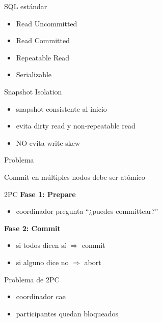 \documentclass[institutional,screen,none]{ua-engineering-v6-beamer}
\begin{document}

\begin{frame}{SQL estándar}
\begin{itemize}
\item Read Uncommitted
\item Read Committed
\item Repeatable Read
\item Serializable
\end{itemize}
\end{frame}

\begin{frame}{Snapshot Isolation}
\begin{itemize}
\item snapshot consistente al inicio
\item evita dirty read y non-repeatable read
\item NO evita write skew
\end{itemize}
\end{frame}


\begin{frame}{Problema}
\begin{block}{}
Commit en múltiples nodos debe ser atómico
\end{block}
\end{frame}

\begin{frame}{2PC}
\textbf{Fase 1: Prepare}
\begin{itemize}
\item coordinador pregunta “¿puedes committear?”
\end{itemize}

\textbf{Fase 2: Commit}
\begin{itemize}
\item si todos dicen sí $\Rightarrow$ commit
\item si alguno dice no $\Rightarrow$ abort
\end{itemize}
\end{frame}

\begin{frame}{Problema de 2PC}
\begin{itemize}
\item coordinador cae
\item participantes quedan bloqueados
\end{itemize}
\end{frame}
\end{document}
